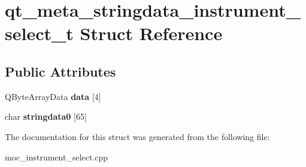 \hypertarget{structqt__meta__stringdata__instrument__select__t}{}\section{qt\+\_\+meta\+\_\+stringdata\+\_\+instrument\+\_\+select\+\_\+t Struct Reference}
\label{structqt__meta__stringdata__instrument__select__t}
\subsection*{Public Attributes}
\begin{DoxyCompactItemize}
\item 
\mbox{\label{structqt__meta__stringdata__instrument__select__t_a4c069e9002fbded36b0dfac4097d3c5a}} 
Q\+Byte\+Array\+Data {\bfseries data} \mbox{[}4\mbox{]}
\item 
\mbox{\label{structqt__meta__stringdata__instrument__select__t_aa03cbad49487d81e3c2ee869132224d4}} 
char {\bfseries stringdata0} \mbox{[}65\mbox{]}
\end{DoxyCompactItemize}


The documentation for this struct was generated from the following file\+:\begin{DoxyCompactItemize}
\item 
moc\+\_\+instrument\+\_\+select.\+cpp\end{DoxyCompactItemize}
